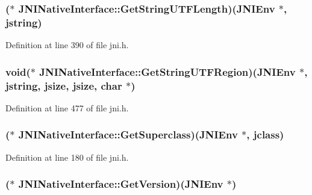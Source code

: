 \hypertarget{struct_j_n_i_native_interface_a17463a1c4dfd12402cbcca8e50836c64}{
\subsubsection[{Get\-String\-U\-T\-F\-Length}]{($\ast$ J\-N\-I\-Native\-Interface\-::\-Get\-String\-U\-T\-F\-Length)({\bf J\-N\-I\-Env} $\ast$, {\bf jstring})}}\label{struct_j_n_i_native_interface_a17463a1c4dfd12402cbcca8e50836c64}


Definition at line 390 of file jni.\-h.

\hypertarget{struct_j_n_i_native_interface_ad087a4e1762a2da7a92313d493b94ec9}{
\subsubsection[{Get\-String\-U\-T\-F\-Region}]{\setlength{\rightskip}{0pt plus 5cm}void($\ast$ J\-N\-I\-Native\-Interface\-::\-Get\-String\-U\-T\-F\-Region)({\bf J\-N\-I\-Env} $\ast$, {\bf jstring}, {\bf jsize}, {\bf jsize}, char $\ast$)}}\label{struct_j_n_i_native_interface_ad087a4e1762a2da7a92313d493b94ec9}


Definition at line 477 of file jni.\-h.

\hypertarget{struct_j_n_i_native_interface_a47240bb9ca9e0507914bdce0527362ef}{
\subsubsection[{Get\-Superclass}]{($\ast$ J\-N\-I\-Native\-Interface\-::\-Get\-Superclass)({\bf J\-N\-I\-Env} $\ast$, {\bf jclass})}}\label{struct_j_n_i_native_interface_a47240bb9ca9e0507914bdce0527362ef}


Definition at line 180 of file jni.\-h.

\hypertarget{struct_j_n_i_native_interface_a2367c1d9e9d25ad9bf6371216191f848}{
\subsubsection[{Get\-Version}]{($\ast$ J\-N\-I\-Native\-Interface\-::\-Get\-Version)({\bf J\-N\-I\-Env} $\ast$)}}\label{struct_j_n_i_native_interface_a2367c1d9e9d25ad9bf6371216191f848}



